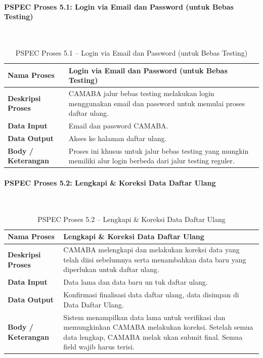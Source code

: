 \paragraph{PSPEC Proses 5.1: Login via Email dan Password (untuk Bebas Testing)}~\\
\begin{longtable}{|p{}|p{}|}
	\caption{PSPEC Proses 5.1 -- Login via Email dan Password (untuk Bebas Testing)}
	\label{table:3.pspec51}\\
	\hline
	\textbf{Nama Proses} & Login via Email dan Password (untuk Bebas Testing) \\
	\hline
	\textbf{Deskripsi Proses} & CAMABA jalur bebas testing melakukan login menggunakan email dan password untuk memulai proses daftar ulang. \\
	\hline
	\textbf{Data Input} & Email dan password CAMABA. \\
	\hline
	\textbf{Data Output} & Akses ke halaman daftar ulang. \\
	\hline
	\textbf{Body / Keterangan} & Proses ini khusus untuk jalur bebas testing yang mungkin memiliki alur login berbeda dari jalur testing reguler. \\
	\hline
\end{longtable}

\paragraph{PSPEC Proses 5.2: Lengkapi \& Koreksi Data Daftar Ulang}~\\
\begin{longtable}{|p{}|p{}|}
	\caption{PSPEC Proses 5.2 -- Lengkapi \& Koreksi Data Daftar Ulang}
	\label{table:3.pspec52}\\
	\hline
	\textbf{Nama Proses} & Lengkapi \& Koreksi Data Daftar Ulang \\
	\hline
	\textbf{Deskripsi Proses} & CAMABA melengkapi dan melakukan koreksi data yang telah diisi sebelumnya serta menambahkan data baru yang diperlukan untuk daftar ulang. \\
	\hline
	\textbf{Data Input} & Data lama dan data baru un tuk daftar ulang. \\
	\hline
	\textbf{Data Output} & Konfirmasi finalisasi data daftar ulang, data disimpan di Data Daftar Ulang. \\
	\hline
	\textbf{Body / Keterangan} & Sistem menampilkan data lama untuk verifikasi dan memungkinkan CAMABA melakukan koreksi. Setelah semua data lengkap, CAMABA melak ukan submit final. Semua field wajib harus terisi. \\
	\hline
\end{longtable}


